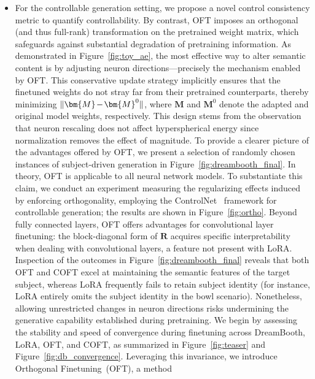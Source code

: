 \begin{itemize}[leftmargin=*,nosep]
for OFT the complexity reduces to $\mathcal{O}(d)$. \textbf{Quantitative comparison}. For instance, LoRA needs 20 epochs to attain the same performance level that OFT achieves by epoch 8. We point out two primary distinctions between our OFT approach and the method in \cite{liu2021orthogonal}. Even with the Cayley-based parameterization, representing a full $\bm{R}$ remains inefficient in terms of parameters when $d$ is large. Through extensive empirical analysis, we report marked improvements over previous techniques regarding output quality, training convergence rate, and finetuning robustness. To overcome this, we introduce a block-diagonal structure for $\bm{R}$, comprising $r$ blocks. Regarding the L2F task, our method most effectively maintains accurate pose information in generated faces, even when presented with difficult pose variations. \item For the controllable generation setting, we propose a novel control consistency metric to quantify controllability. By contrast, OFT imposes an orthogonal (and thus full-rank) transformation on the pretrained weight matrix, which safeguards against substantial degradation of pretraining information. As demonstrated in Figure~\ref{fig:toy_ae}, the most effective way to alter semantic content is by adjusting neuron directions—precisely the mechanism enabled by OFT. This conservative update strategy implicitly ensures that the finetuned weights do not stray far from their pretrained counterparts, thereby minimizing $\thickmuskip=2mu \medmuskip=2mu \| \bm{M} - \bm{M}^0\|$, where $\bm{M}$ and $\bm{M}^0$ denote the adapted and original model weights, respectively. This design stems from the observation that neuron rescaling does not affect hyperspherical energy since normalization removes the effect of magnitude. To provide a clearer picture of the advantages offered by OFT, we present a selection of randomly chosen instances of subject-driven generation in Figure~\ref{fig:dreambooth_final}. In theory, OFT is applicable to all neural network models. To substantiate this claim, we conduct an experiment measuring the regularizing effects induced by enforcing orthogonality, employing the ControlNet~\cite{zhang2023adding} framework for controllable generation; the results are shown in Figure~\ref{fig:ortho}. Beyond fully connected layers, OFT offers advantages for convolutional layer finetuning: the block-diagonal form of $\bm{R}$ acquires specific interpretability when dealing with convolutional layers, a feature not present with LoRA. Inspection of the outcomes in Figure~\ref{fig:dreambooth_final} reveals that both OFT and COFT excel at maintaining the semantic features of the target subject, whereas LoRA frequently fails to retain subject identity (for instance, LoRA entirely omits the subject identity in the bowl scenario). Nonetheless, allowing unrestricted changes in neuron directions risks undermining the generative capability established during pretraining. We begin by assessing the stability and speed of convergence during finetuning across DreamBooth, LoRA, OFT, and COFT, as summarized in Figure~\ref{fig:teaser} and Figure~\ref{fig:db_convergence}. Leveraging this invariance, we introduce Orthogonal Finetuning~(OFT), a method 
\end{itemize}
